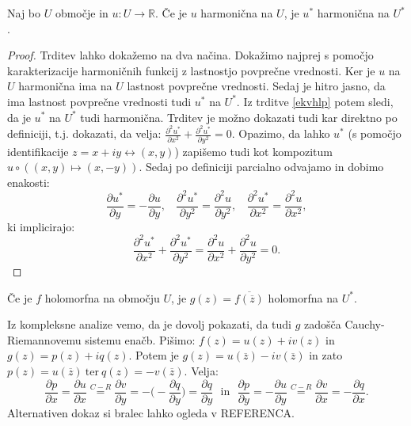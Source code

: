 \documentclass[mat1]{fmfdelo}
\begin{document}
    \begin{lema}
        \label{lemaharm}
        Naj bo $U$ območje in $u: U \to \mathbb{R}$. Če je $u$ harmonična na $U$, je $u^*$ harmonična na $U^*$. 
    \end{lema}
    \begin{proof}
        Trditev lahko dokažemo na dva načina. Dokažimo najprej s pomočjo karakterizacije harmoničnih funkcij z lastnostjo povprečne vrednosti. 
        Ker je $u$ na $U$ harmonična ima na $U$ lastnost povprečne vrednosti.
        Sedaj je hitro jasno, da ima lastnost povprečne vrednosti tudi $u^*$ na $U^*$. 
        Iz trditve \ref{ekvhlp} potem sledi, da je $u^*$ na $U^*$ tudi harmonična.
        \newline
        Trditev je možno dokazati tudi kar direktno po definiciji, t.j. dokazati, da velja: $\frac{\partial^2 u^*}{\partial x^2} + \frac{\partial^2 u^*}{\partial y^2} = 0$. 
        Opazimo, da lahko $u^*$ (s pomočjo identifikacije $z = x + iy \leftrightarrow (x,y)$) zapišemo tudi kot kompozitum $u \circ ((x,y) \mapsto (x, -y))$. 
        Sedaj po definiciji parcialno odvajamo in dobimo enakosti:
        $$
            \frac{\partial u^*}{\partial y} = - \frac{\partial u }{\partial y},~~~~\frac{\partial^2 u^*}{\partial y^2} = \frac{\partial^2 u }{\partial y^2},~~~~\frac{\partial^2 u^*}{\partial x^2} = \frac{\partial^2 u }{\partial x^2},
        $$
        ki implicirajo:
        $$
            \frac{\partial^2 u^*}{\partial x^2} + \frac{\partial^2 u^*}{\partial y^2} = \frac{\partial^2 u}{\partial x^2} + \frac{\partial^2 u}{\partial y^2} = 0.
        $$
    \end{proof}
    \begin{lema}
        Če je $f$ holomorfna na območju $U$, je $g(z) = \overline{f({\overline{z}})}$ holomorfna na $U^*$.
    \end{lema}
    \begin{dokaz}
        Iz kompleksne analize vemo, da je dovolj pokazati, da tudi $g$ zadošča Cauchy-Riemannovemu sistemu enačb.
        \newline
        Pišimo: $f(z) = u(z) + iv(z)$ in $g(z) = p(z) + iq(z)$.
        Potem je $g(z) = u(\overline{z}) - iv(\overline{z})$ in zato $p(z) = u(\overline{z})~\text{ter}~q(z) = -v(\overline{z})$. 
        \newline
        Velja:
        \begin{equation*}
            \frac{\partial p}{\partial x} = \frac{\partial u}{\partial x} \overset{C-R}{=} \frac{\partial v}{\partial y} = - \bigg(- \frac{\partial q}{\partial y}\bigg) = \frac{\partial q}{\partial y}~~~\text{in}~~~
            \frac{\partial p}{\partial y} = -\frac{\partial u}{\partial y} \overset{C-R}{=} \frac{\partial v}{\partial x} = -\frac{\partial q}{\partial x}.
        \end{equation*}
        Alternativen dokaz si bralec lahko ogleda v REFERENCA.
    \end{dokaz}
\end{document}

